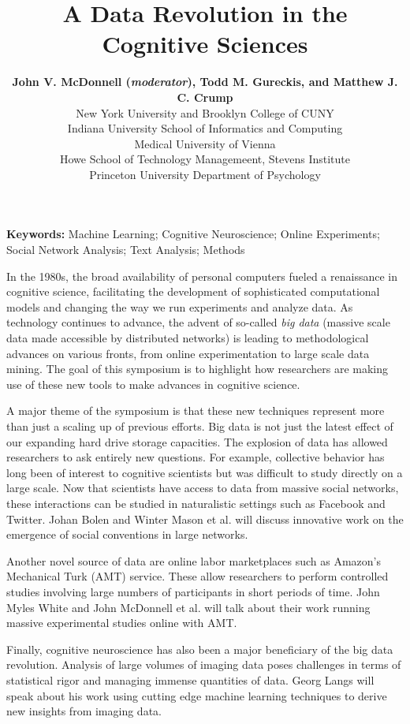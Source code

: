 \documentclass[10pt,letterpaper]{article}
\title{A Data Revolution in the Cognitive Sciences}
\author{{\large \bf John V. McDonnell (\emph{moderator}), Todd M. Gureckis, and
Matthew J. C. Crump}\\ New York University and Brooklyn College of CUNY 
  \AND {\large \bf Johan Bollen} \\
  Indiana University School of Informatics and Computing
  \AND {\large \bf Georg Langs} \\
  Medical University of Vienna
  \AND {\large \bf Winter Mason, Meeyoung Cha, Krishna Gummadi, Farshad Kooti, and Haeryun Yang} \\
  Howe School of Technology Managemeent, Stevens Institute 
  \AND {\large \bf John Myles White} \\
  Princeton University Department of Psychology }
\begin{document}
\maketitle

\begin{footnotesize}
\textbf{Keywords:} 
Machine Learning; Cognitive Neuroscience; Online Experiments; Social Network
Analysis; Text Analysis; Methods
\end{footnotesize}

In the 1980s, the broad availability of personal computers fueled a renaissance
in cognitive science, facilitating the development of sophisticated computational
models and changing the way we run experiments and analyze data. As technology
continues to advance, the advent of so-called \emph{big data} (massive scale data
made accessible by distributed networks) is leading to methodological advances on
various fronts, from online experimentation to large scale data mining. The goal
of this symposium is to highlight how researchers are making use of these new
tools to make advances in cognitive science.

A major theme of the symposium is that these new techniques represent more than
just a scaling up of previous efforts. Big data is not just the latest effect of
our expanding hard drive storage capacities. The explosion of data has allowed
researchers to ask entirely new questions. For example, collective behavior has
long been of interest to cognitive scientists but was difficult to study directly
on a large scale. Now that scientists have access to data from massive social
networks, these interactions can be studied in naturalistic settings such as
Facebook and Twitter. Johan Bolen and Winter Mason et al. will discuss innovative
work on the emergence of social conventions in large networks.

Another novel source of data are online labor marketplaces such as Amazon's
Mechanical Turk (AMT) service. These allow researchers to perform controlled
studies involving large numbers of participants in short periods of time. John
Myles White and John McDonnell et al. will talk about their work running massive
experimental studies online with AMT.

Finally, cognitive neuroscience has also been a major beneficiary of the big data
revolution. Analysis of large volumes of imaging data poses challenges in terms
of statistical rigor and managing immense quantities of data. Georg Langs will
speak about his work using cutting edge machine learning techniques to derive new
insights from imaging data.
\end{document}
